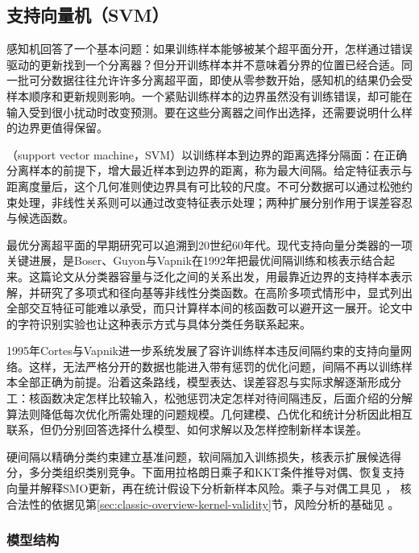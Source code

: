 \subsection{支持向量机（SVM）}
\label{sec:classification-svm}

感知机回答了一个基本问题：如果训练样本能够被某个超平面分开，怎样通过错误驱动的更新找到一个分离器？但分开训练样本并不意味着分界的位置已经合适。同一批可分数据往往允许许多分离超平面，即使从零参数开始，感知机的结果仍会受样本顺序和更新规则影响。一个紧贴训练样本的边界虽然没有训练错误，却可能在输入受到很小扰动时改变预测。要在这些分离器之间作出选择，还需要说明什么样的边界更值得保留。

（support vector machine，SVM）以训练样本到边界的距离选择分隔面：在正确分离样本的前提下，增大最近样本到边界的距离，称为最大间隔。给定特征表示与距离度量后，这个几何准则使边界具有可比较的尺度。不可分数据可以通过松弛约束处理，非线性关系则可以通过改变特征表示处理；两种扩展分别作用于误差容忍与候选函数。

最优分离超平面的早期研究可以追溯到20世纪60年代。现代支持向量分类器的一项关键进展，是Boser、Guyon与Vapnik在1992年把最优间隔训练和核表示结合起来。这篇论文从分类器容量与泛化之间的关系出发，用最靠近边界的支持样本表示解，并研究了多项式和径向基等非线性分类函数。在高阶多项式情形中，显式列出全部交互特征可能难以承受，而只计算样本间的核函数可以避开这一展开。论文中的字符识别实验也让这种表示方式与具体分类任务联系起来。

1995年Cortes与Vapnik进一步系统发展了容许训练样本违反间隔约束的支持向量网络。这样，无法严格分开的数据也能进入带有惩罚的优化问题，间隔不再以训练样本全部正确为前提。沿着这条路线，模型表达、误差容忍与实际求解逐渐形成分工：核函数决定怎样比较输入，松弛惩罚决定怎样对待间隔违反，后面介绍的分解算法则降低每次优化所需处理的问题规模。几何建模、凸优化和统计分析因此相互联系，但仍分别回答选择什么模型、如何求解以及怎样控制新样本误差。

硬间隔以精确分类约束建立基准问题，软间隔加入训练损失，核表示扩展候选得分，多分类组织类别竞争。下面用拉格朗日乘子和KKT条件推导对偶、恢复支持向量并解释SMO更新，再在统计假设下分析新样本风险。乘子与对偶工具见
，
核合法性的依据见第\ref{sec:classic-overview-kernel-validity}节，风险分析的基础见
。

\subsubsection{模型结构}
\label{sec:classification-svm-model}

